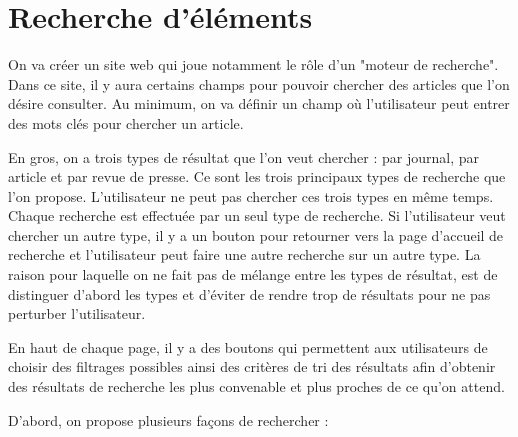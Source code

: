 \section{Recherche d'éléments}
\label{sec:recherche}

On va créer un site web qui joue notamment le rôle d'un "moteur de recherche". Dans ce site, il y aura certains champs pour pouvoir chercher des articles que l'on désire consulter. Au minimum, on va définir un champ où l'utilisateur peut entrer des mots clés pour chercher un article. 

En gros, on a trois types de résultat que l’on veut chercher : par journal, par article et par revue de presse. Ce sont les trois principaux types de recherche que l’on propose. L’utilisateur ne peut pas chercher ces trois types en même temps. Chaque recherche est effectuée par un seul type de recherche. Si l’utilisateur veut chercher un autre type,  il y a un bouton pour retourner vers la page d’accueil de recherche et l’utilisateur peut faire une autre recherche sur un autre type. La raison pour laquelle on ne fait pas de mélange entre les types de résultat, est de distinguer d’abord les types et d'éviter de rendre trop de résultats pour ne pas perturber l’utilisateur.

En haut de chaque page, il y a des boutons qui permettent aux utilisateurs de choisir des filtrages possibles ainsi des critères de tri des résultats afin d'obtenir des résultats de recherche les plus convenable et plus proches de ce qu’on attend.

D’abord, on propose plusieurs façons de rechercher : 

